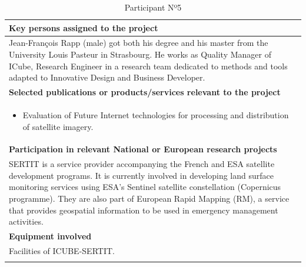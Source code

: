 \begin{longtable}[H]{|p{0.7cm}|p{4cm}|p{7cm}|p{1.3cm}|}
	\multicolumn{4}{|p{13cm}|}{\textbf{Key persons assigned to the project}}   \\ \hline
	
	\multicolumn{4}{|p{14.5cm}|}{Jean-François Rapp (male) got both his degree and his master from the University Louis Pasteur in Strasbourg. He works as Quality Manager of ICube, Research Engineer in a research team dedicated to methods and tools adapted to Innovative Design and Business Developer.  } \\ \hline
	
	\multicolumn{4}{|p{13cm}|}{\textbf{Selected publications or products/services relevant to the project}}  \\ \hline
	
	\multicolumn{4}{|p{14.5cm}|}{
		\begin{itemize} 
			\item \vspace{-0.5cm}Evaluation of Future Internet technologies for processing and distribution of satellite imagery.\vspace{-0.3cm}
		\end{itemize}}  \\ \hline
	
	\multicolumn{4}{|p{13cm}|}{\textbf{Participation in relevant National or European research projects}}  \\ \hline
	
	\multicolumn{4}{|p{14.5cm}|}{SERTIT is a service provider accompanying the French and ESA satellite development programs. It is currently involved in developing land surface monitoring services using ESA's Sentinel satellite constellation (Copernicus programme). They are also part of European Rapid Mapping (RM), a service that provides geospatial information to be used in emergency management activities.}  \\ \hline
	
	\multicolumn{4}{|p{13cm}|}{\textbf{Equipment involved}}  \\ \hline
	
	\multicolumn{4}{|p{14.5cm}|}{Facilities of ICUBE-SERTIT.}  \\ \hline
	\caption{Participant Nº5}
\end{longtable}



